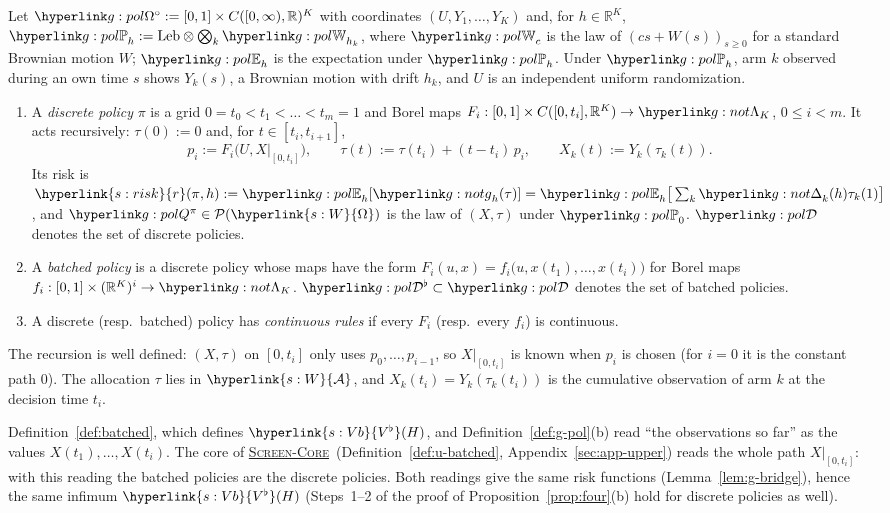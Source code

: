 \documentclass[11pt]{article}
\newcommand{\dt}[1]{\hypertarget{#1}{}}
\DeclareRobustCommand{\sy}[2]{{\hyperlink{#1}{#2}}}
\newcommand{\R}{\mathbb{R}}
\newcommand{\1}{\mathbf{1}}
\newcommand{\Om}{\sy{s:W}{\Omega}}
\newcommand{\Al}{\sy{s:W}{\mathcal A}}
\newcommand{\rk}{\sy{s:risk}{r}}
\newcommand{\Vb}{\sy{s:Vb}{V^\flat}}
\newcommand{\SC}{\sy{alg:sc}{\textsc{Screen-Core}}}
\begin{document}
\begin{definition}\label{def:g-pol}\dt{g:pol}
Let $\gOs:=[0,1]\times C([0,\infty),\R)^K$ with coordinates $(U,Y_1,\dots,Y_K)$ and, for $h\in\R^K$, $\gPh_h:=\mathrm{Leb}\otimes\bigotimes_k\gWi_{h_k}$, where $\gWi_c$
is the law of $(cs+W(s))_{s\ge0}$ for a standard Brownian motion $W$; $\gEh_h$ is the expectation under $\gPh_h$. Under $\gPh_h$, arm $k$ observed during an own time
$s$ shows $Y_k(s)$, a Brownian motion with drift $h_k$, and $U$ is an independent uniform randomization.
\begin{enumerate}
\item[(a)] A \emph{discrete policy} $\pi$ is a grid $0=t_0<t_1<\dots<t_m=1$ and Borel maps $F_i:[0,1]\times C([0,t_i],\R^K)\to\gSmp$, $0\le i<m$. It acts recursively:
$\tau(0):=0$ and, for $t\in[t_i,t_{i+1}]$,
\[
p_i:=F_i\big(U,X|_{[0,t_i]}\big),\qquad \tau(t):=\tau(t_i)+(t-t_i)\,p_i,\qquad X_k(t):=Y_k(\tau_k(t)).
\]
Its risk is $\rk(\pi,h):=\gEh_h[\ggh_h(\tau)]=\gEh_h\big[\sum_k\gGp_k(h)\tau_k(1)\big]$, and $\gQp\pi\in\mathcal P(\Om)$ is the law of $(X,\tau)$ under $\gPh_0$.
$\gDc$ denotes the set of discrete policies.
\item[(b)] A \emph{batched policy} is a discrete policy whose maps have the form $F_i(u,x)=f_i\big(u,x(t_1),\dots,x(t_i)\big)$ for Borel maps
$f_i:[0,1]\times(\R^K)^i\to\gSmp$. $\gBc\subset\gDc$ denotes the set of batched policies.
\item[(c)] A discrete (resp.\ batched) policy has \emph{continuous rules} if every $F_i$ (resp.\ every $f_i$) is continuous.
\end{enumerate}
\end{definition}

\noindent The recursion is well defined: $(X,\tau)$ on $[0,t_i]$ only uses $p_0,\dots,p_{i-1}$, so $X|_{[0,t_i]}$ is known when $p_i$ is chosen (for $i=0$ it is the
constant path $0$). The allocation $\tau$ lies in $\Al$, and $X_k(t_i)=Y_k(\tau_k(t_i))$ is the cumulative observation of arm $k$ at the decision time $t_i$.

\begin{remark}\label{rem:g-reading}
Definition~\ref{def:batched}, which defines $\Vb(H)$, and Definition~\ref{def:g-pol}(b) read ``the observations so far'' as the values $X(t_1),\dots,X(t_i)$.
The core of \SC\ (Definition~\ref{def:u-batched}, Appendix~\ref{sec:app-upper}) reads the whole path $X|_{[0,t_i]}$: with this reading the batched policies are the
discrete policies. Both readings give the same risk functions (Lemma~\ref{lem:g-bridge}), hence the same infimum $\Vb(H)$ (Steps~1--2 of the proof of
Proposition~\ref{prop:four}(b) hold for discrete policies as well).
\end{remark}
\end{document}
